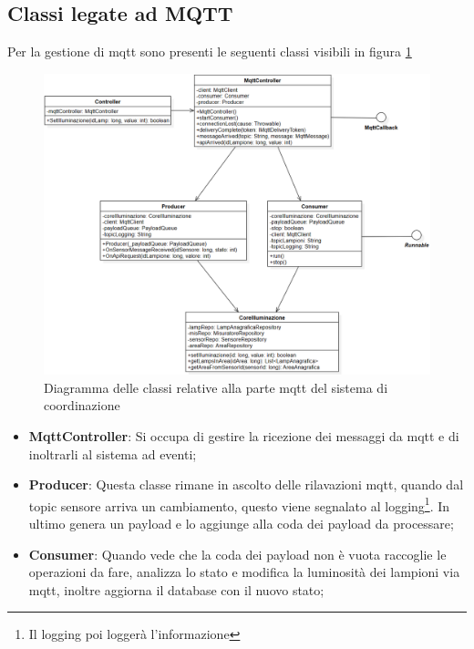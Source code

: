 \subsection{Classi legate ad MQTT}

Per la gestione di mqtt sono presenti le seguenti classi visibili in figura \ref{fig:coordinazione_mqtt}

\begin{figure}[h]
    \centering
    \includegraphics[width=\textwidth]{img/illuminazione_mqtt.png}
    \caption{Diagramma delle classi relative alla parte mqtt del sistema di coordinazione}
    \label{fig:coordinazione_mqtt}
\end{figure}


\begin{itemize}
    \item \textbf{MqttController}: Si occupa di gestire la ricezione dei messaggi da mqtt e di inoltrarli al sistema ad eventi;
    \item \textbf{Producer}: Questa classe rimane in ascolto delle rilavazioni mqtt, quando dal topic sensore arriva un cambiamento, questo viene segnalato al logging\footnote{Il logging poi loggerà l'informazione}. In ultimo genera un payload e lo aggiunge alla coda dei payload da processare;
    \item \textbf{Consumer}: Quando vede che la coda dei payload non è vuota raccoglie le operazioni da fare, analizza lo stato e modifica la luminosità dei lampioni via mqtt, inoltre aggiorna il database con il nuovo stato;
\end{itemize}


